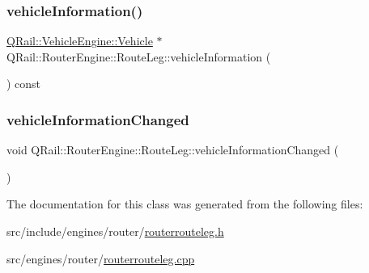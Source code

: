\mbox{\label{classQRail_1_1RouterEngine_1_1RouteLeg_aab16baf53c857a981e2d9816572818ed}} 
\subsubsection{\texorpdfstring{vehicleInformation()}{vehicleInformation()}}
{\footnotesize\ttfamily \mbox{\hyperlink{classQRail_1_1VehicleEngine_1_1Vehicle}{Q\+Rail\+::\+Vehicle\+Engine\+::\+Vehicle}} $\ast$ Q\+Rail\+::\+Router\+Engine\+::\+Route\+Leg\+::vehicle\+Information (\begin{DoxyParamCaption}{ }\end{DoxyParamCaption}) const}

\mbox{\label{classQRail_1_1RouterEngine_1_1RouteLeg_af30e3314b500b47610b15d5b737e550e}} 
\subsubsection{\texorpdfstring{vehicleInformationChanged}{vehicleInformationChanged}}
{\footnotesize\ttfamily void Q\+Rail\+::\+Router\+Engine\+::\+Route\+Leg\+::vehicle\+Information\+Changed (\begin{DoxyParamCaption}{ }\end{DoxyParamCaption})\hspace{0.3cm}{\ttfamily [signal]}}



The documentation for this class was generated from the following files\+:\begin{DoxyCompactItemize}
\item 
src/include/engines/router/\mbox{\hyperlink{routerrouteleg_8h}{routerrouteleg.\+h}}\item 
src/engines/router/\mbox{\hyperlink{routerrouteleg_8cpp}{routerrouteleg.\+cpp}}\end{DoxyCompactItemize}
